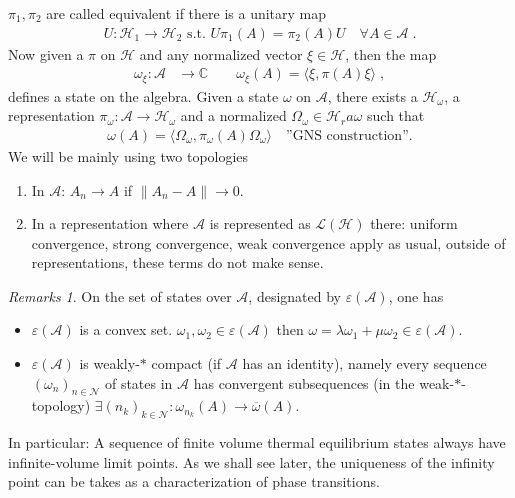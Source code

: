 \documentclass[
a4paper, %
11pt, %
onecolumn, %
openany, %
]{memoir}
\theoremstyle{definition}
\theoremstyle{remark}
\newtheorem{remarks}[definition]{Remarks}
\theoremstyle{plain}
\begin{document}
$\pi_1,\pi_2$ are called equivalent if there is a unitary map \begin{align}
U:\mathcal{H}_1\rightarrow \mathcal{H}_2 \text{ s.t. } U\pi_1(A)=\pi_2(A)U\quad \forall A\in \mathcal{A}\; .
\end{align}
Now given a $\pi$ on $\mathcal{H}$ and any normalized vector $\xi\in\mathcal{H}$, then the map \begin{align}
\omega_{\xi}:\mathcal{A}&\longrightarrow \mathbb{C}\qquad \omega_{\xi}(A)=\langle\xi,\pi(A)\xi\rangle \; ,
\end{align}
defines a state on the algebra. Given a state $\omega$ on $\mathcal{A}$, there exists a $\mathcal{H}_{\omega}$, a representation $\pi_{\omega}:\mathcal{A}\rightarrow \mathcal{H}_{\omega}$ and a normalized $\Omega_{\omega}\in\mathcal{H}_ra{\omega}$ such that \begin{align}
\omega(A)=\langle\Omega_{\omega},\pi_{\omega}(A)\Omega_{\omega}\rangle \quad \text{''GNS construction''.}
\end{align}
We will be mainly using two topologies \begin{enumerate}
	\item In $\mathcal{A}$: $A_n\rightarrow A$ if $\|A_n-A\|\rightarrow 0$. 
	\item In a representation where $\mathcal{A}$ is represented as $\mathcal{L}(\mathcal{H})$ there: uniform convergence, strong convergence, weak convergence apply as usual, outside of representations, these terms do not make sense.
\end{enumerate}
\begin{remarks}
	On the set of states over $\mathcal{A}$, designated by $\varepsilon(\mathcal{A})$, one has \begin{itemize}
		\item $\varepsilon(\mathcal{A})$ is a convex set. $\omega_1,\omega_2\in\varepsilon(\mathcal{A})$ then $\omega=\lambda\omega_1+\mu\omega_2\in\varepsilon(\mathcal{A})$.
		\item $\varepsilon(\mathcal{A})$ is weakly-$*$ compact (if $\mathcal{A}$ has an identity), namely every sequence $(\omega_n)_{n\in\mathcal{N}}$ of states in $\mathcal{A}$ has convergent subsequences (in the weak-$*$-topology) $\exists(n_k)_{k\in\mathcal{N}}:\omega_{n_k}(A)\rightarrow \overline{\omega}(A)$.
	\end{itemize}
In particular: A sequence of finite volume thermal equilibrium states always have infinite-volume limit points. As we shall see later, the uniqueness of the infinity point can be takes as a characterization of phase transitions.
\end{remarks}
\end{document}
